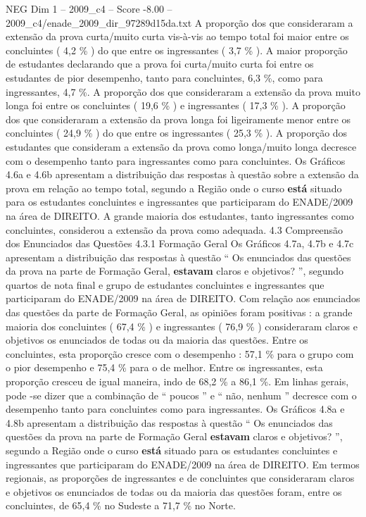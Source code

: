 \begin{textsample}{NEG Dim 1 – 2009\_c4 – Score -8.00 – 2009\_c4/enade\_2009\_dir\_97289d15da.txt}
A proporção dos que consideraram a extensão da prova curta/muito curta vis-à-vis ao tempo total foi maior entre os concluintes ( 4,2 \% ) do que entre os ingressantes ( 3,7 \% ).
A maior proporção de estudantes declarando que a prova foi curta/muito curta foi entre os estudantes de pior desempenho, tanto para concluintes, 6,3 \%, como para ingressantes, 4,7 \%.
A proporção dos que consideraram a extensão da prova muito longa foi entre os concluintes ( 19,6 \% ) e ingressantes ( 17,3 \% ).
A proporção dos que consideraram a extensão da prova longa foi ligeiramente menor entre os concluintes ( 24,9 \% ) do que entre os ingressantes ( 25,3 \% ).
A proporção dos estudantes que consideram a extensão da prova como longa/muito longa decresce com o desempenho tanto para ingressantes como para concluintes.
Os Gráficos 4.6a e 4.6b apresentam a distribuição das respostas à questão sobre a extensão da prova em relação ao tempo total, segundo a Região onde o curso \textbf{está} situado para os estudantes concluintes e ingressantes que participaram do ENADE/2009 na área de DIREITO.
A grande maioria dos estudantes, tanto ingressantes como concluintes, considerou a extensão da prova como adequada. 4.3 Compreensão dos Enunciados das Questões 4.3.1 Formação Geral Os Gráficos 4.7a, 4.7b e 4.7c apresentam a distribuição das respostas à questão “ Os enunciados das questões da prova na parte de Formação Geral, \textbf{estavam} claros e objetivos? ”, segundo quartos de nota final e grupo de estudantes concluintes e ingressantes que participaram do ENADE/2009 na área de DIREITO.
Com relação aos enunciados das questões da parte de Formação Geral, as opiniões foram positivas : a grande maioria dos concluintes ( 67,4 \% ) e ingressantes ( 76,9 \% ) consideraram claros e objetivos os enunciados de todas ou da maioria das questões.
Entre os concluintes, esta proporção cresce com o desempenho : 57,1 \% para o grupo com o pior desempenho e 75,4 \% para o de melhor.
Entre os ingressantes, esta proporção cresceu de igual maneira, indo de 68,2 \% a 86,1 \%.
Em linhas gerais, pode -se dizer que a combinação de “ poucos ” e “ não, nenhum ” decresce com o desempenho tanto para concluintes como para ingressantes.
Os Gráficos 4.8a e 4.8b apresentam a distribuição das respostas à questão “ Os enunciados das questões da prova na parte de Formação Geral \textbf{estavam} claros e objetivos? ”, segundo a Região onde o curso \textbf{está} situado para os estudantes concluintes e ingressantes que participaram do ENADE/2009 na área de DIREITO.
Em termos regionais, as proporções de ingressantes e de concluintes que consideraram claros e objetivos os enunciados de todas ou da maioria das questões foram, entre os concluintes, de 65,4 \% no Sudeste a 71,7 \% no Norte.

\end{textsample}
